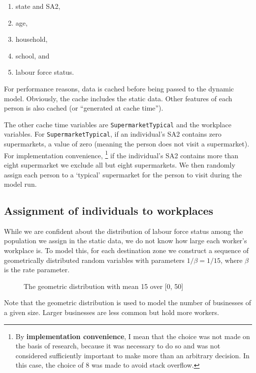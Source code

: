\documentclass[submission]{grattan}
\newcommand*{\code}[1]{\texttt{#1}}
\newcommand*{\defi}[1]{\textbf{#1}}
\begin{document}
\begin{enumerate}
	\item state and SA2,
	\item age,
	\item household,
	\item school, and
	\item labour force status.
\end{enumerate}

For performance reasons, data is cached before being passed to the dynamic model.
Obviously, the cache includes the static data. Other features of each person is
also cached (or ``generated at cache time''). 

The other cache time variables are \code{SupermarketTypical} and the workplace variables.
For \code{SupermarketTypical},
if an individual's SA2 contains zero supermarkets,
a value of zero (meaning the person does not visit a supermarket).
For implementation convenience,%
	\footnote{By \defi{implementation convenience}, I mean that the choice was not made
	on the basis of research, because it was necessary to do so and was not considered
	sufficiently important to make more than an arbitrary decision. In this case,
	the choice of 8 was made to avoid stack overflow.}
if the individual's SA2 contains more than eight supermarket we
exclude all but eight supermarkets. We then randomly assign each person to 
a `typical' supermarket for the person to visit during the model run.


\subsection{Assignment of individuals to workplaces}
While we are confident about the distribution of labour force status among
the population we assign in the static data, we do not know how large each
worker's workplace is. To model this, for each destination zone we construct
a sequence of geometrically distributed random variables with parameters
\(1/\beta = 1/15\), where \(\beta\) is the rate parameter.

\begin{figure}[!htbp]
\caption{The geometric distribution with mean 15 over [0, 50]}\label{fig:geom-distr}
\par
	
\end{figure}

Note that the geometric distribution is used to model the number of businesses of a given
size. Larger businesses are less common but hold more workers.
\end{document}
